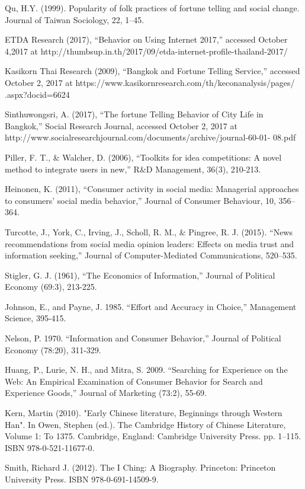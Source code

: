 \documentclass[conference]{IEEEtran}
\begin{document}
\begin{thebibliography}{1}
 Qu, H.Y. (1999). Popularity of folk practices of fortune telling and social change. Journal of
Taiwan Sociology, 22, 1–45.

 ETDA Research (2017), “Behavior on Using Internet 2017,” accessed October 4,2017
at http://thumbsup.in.th/2017/09/etda-internet-profile-thailand-2017/

 Kasikorn Thai Research (2009), “Bangkok and Fortune Telling Service,” accessed
October 2, 2017 at https://www.kasikornresearch.com/th/keconanalysis/pages/
.aspx?docid=6624

 Sinthuwongsri, A. (2017), “The fortune Telling Behavior of City Life in Bangkok,”
Social Research Journal, accessed October 2, 2017 at
http://www.socialresearchjournal.com/documents/archive/journal-60-01-
08.pdf

 Piller, F. T., \& Walcher, D. (2006), “Toolkits for idea competitions: A novel method
to integrate users in new,” R\&D Management, 36(3), 210-213.

 Heinonen, K. (2011), “Consumer activity in social media: Managerial approaches to
consumers' social media behavior,” Journal of Consumer Behaviour, 10, 356–364.

 Turcotte, J., York, C., Irving, J., Scholl, R. M., \& Pingree, R. J. (2015). “News
recommendations from social media opinion leaders: Effects on media trust
and information seeking,” Journal of Computer-Mediated Communications,
520–535.

 Stigler, G. J. (1961), “The Economics of Information,” Journal of Political Economy
(69:3), 213-225.

 Johnson, E., and Payne, J. 1985. “Effort and Accuracy in Choice,” Management
Science, 395-415.

 Nelson, P. 1970. “Information and Consumer Behavior,” Journal of Political
Economy (78:20), 311-329.

 Huang, P., Lurie, N. H., and Mitra, S. 2009. “Searching for Experience on the Web:
An Empirical Examination of Consumer Behavior for Search and Experience
Goods,” Journal of Marketing (73:2), 55-69.

 Kern, Martin (2010). "Early Chinese literature, Beginnings through Western Han". In Owen, Stephen (ed.). The Cambridge History of Chinese Literature, Volume 1: To 1375. Cambridge, England: Cambridge University Press. pp. 1–115. ISBN 978-0-521-11677-0.

 Smith, Richard J. (2012). The I Ching: A Biography. Princeton: Princeton University Press. ISBN 978-0-691-14509-9.


\end{thebibliography}
\end{document}
